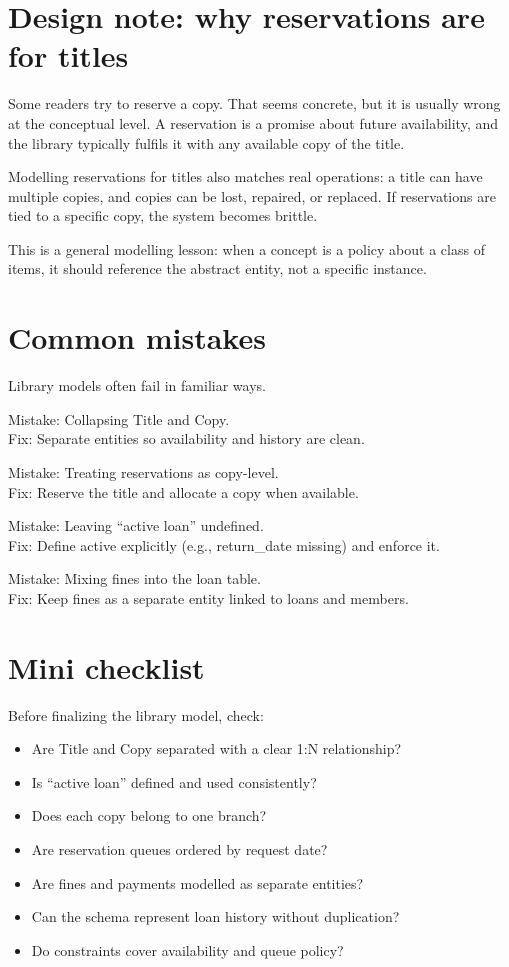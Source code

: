 \section{Design note: why reservations are for titles}
Some readers try to reserve a copy.
That seems concrete, but it is usually wrong at the conceptual level.
A reservation is a promise about future availability, and the library typically fulfils it with any available copy of the title.

Modelling reservations for titles also matches real operations:
a title can have multiple copies, and copies can be lost, repaired, or replaced.
If reservations are tied to a specific copy, the system becomes brittle.

This is a general modelling lesson:
when a concept is a policy about a class of items, it should reference the abstract entity, not a specific instance.

\section{Common mistakes}
Library models often fail in familiar ways.

Mistake: Collapsing Title and Copy.\\
Fix: Separate entities so availability and history are clean.

Mistake: Treating reservations as copy-level.\\
Fix: Reserve the title and allocate a copy when available.

Mistake: Leaving “active loan” undefined.\\
Fix: Define active explicitly (e.g., return\_date missing) and enforce it.

Mistake: Mixing fines into the loan table.\\
Fix: Keep fines as a separate entity linked to loans and members.

\section{Mini checklist}
Before finalizing the library model, check:
\begin{itemize}[leftmargin=*,nosep]
  \item Are Title and Copy separated with a clear 1:N relationship?
  \item Is “active loan” defined and used consistently?
  \item Does each copy belong to one branch?
  \item Are reservation queues ordered by request date?
  \item Are fines and payments modelled as separate entities?
  \item Can the schema represent loan history without duplication?
  \item Do constraints cover availability and queue policy?
\end{itemize}

